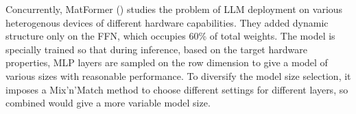 Concurrently, MatFormer (\cite{devvrit2023matformer}) studies the problem of LLM deployment on various heterogenous devices of different hardware capabilities. They added dynamic structure only on the FFN, which occupies 60\% of total weights. The model is specially trained so that during inference, based on the target hardware properties, MLP layers are sampled on the row dimension to give a model of various sizes with reasonable performance. 
To diversify the model size selection, it imposes a Mix’n’Match method to choose different settings for different layers, so combined would give a more variable model size. 


